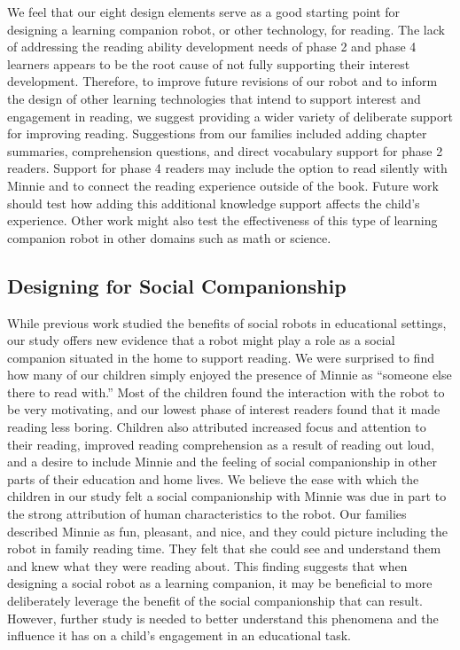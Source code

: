 \documentclass{sigchi}
\begin{document}
We feel that our eight design elements serve as a good starting point for designing a learning companion robot, or other technology, for reading. The lack of addressing the reading ability development needs of phase 2 and phase 4 learners appears to be the root cause of not fully supporting their interest development. Therefore, to improve future revisions of our robot and to inform the design of other learning technologies that intend to support interest and engagement in reading, we suggest providing a wider variety of deliberate support for improving reading. Suggestions from our families included adding chapter summaries, comprehension questions, and direct vocabulary support for phase 2 readers. Support for phase 4 readers may include the option to read silently with Minnie and to connect the reading experience outside of the book. Future work should test how adding this additional knowledge support affects the child's experience. Other work might also test the effectiveness of this type of learning companion robot in other domains such as math or science.

\subsection{Designing for Social Companionship}
While previous work studied the benefits of social robots in educational settings, our study offers new evidence that a robot might play a role as a social companion situated in the home to support reading. We were surprised to find how many of our children simply enjoyed the presence of Minnie as ``someone else there to read with.'' Most of the children found the interaction with the robot to be very motivating, and our lowest phase of interest readers found that it made reading less boring. Children also attributed increased focus and attention to their reading, improved reading comprehension as a result of reading out loud, and a desire to include Minnie and the feeling of social companionship in other parts of their education and home lives. We believe the ease with which the children in our study felt a social companionship with Minnie was due in part to the strong attribution of human characteristics to the robot. Our families described Minnie as fun, pleasant, and nice, and they could picture including the robot in family reading time. They felt that she could see and understand them and knew what they were reading about. This finding suggests that when designing a social robot as a learning companion, it may be beneficial to more deliberately leverage the benefit of the social companionship that can result. However, further study is needed to better understand this phenomena and the influence it has on a child's engagement in an educational task.
\end{document}
